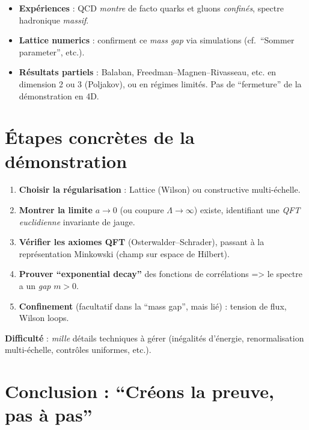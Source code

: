 \documentclass[11pt]{article}
\begin{document}
\begin{itemize}
  \item \textbf{Expériences} : QCD \emph{montre} de facto quarks et gluons \emph{confinés}, spectre hadronique \emph{massif}.
  \item \textbf{Lattice numerics} : confirment ce \emph{mass gap} via simulations (cf.\ “Sommer parameter”, etc.).
  \item \textbf{Résultats partiels} : Balaban, Freedman--Magnen--Rivasseau, etc. en dimension 2 ou 3 (Poljakov), ou en régimes limités. Pas de “fermeture” de la démonstration en 4D.
\end{itemize}

\section{Étapes concrètes de la démonstration}

\begin{enumerate}
  \item \textbf{Choisir la régularisation} : Lattice (Wilson) ou constructive multi-échelle.  
  \item \textbf{Montrer la limite} $a\to 0$ (ou coupure $\Lambda\to\infty$) existe, identifiant une \emph{QFT euclidienne} invariante de jauge.
  \item \textbf{Vérifier les axiomes QFT} (Osterwalder--Schrader), passant à la représentation Minkowski (champ sur espace de Hilbert).
  \item \textbf{Prouver “exponential decay”} des fonctions de corrélations => le spectre a un \emph{gap} $m>0$.
  \item \textbf{Confinement} (facultatif dans la “mass gap”, mais lié) : tension de flux, Wilson loops.
\end{enumerate}

\noindent
\textbf{Difficulté} : \emph{mille} détails techniques à gérer (inégalités d'énergie, renormalisation multi-échelle, contrôles uniformes, etc.).

\section{Conclusion : “Créons la preuve, pas à pas”}
\end{document}
